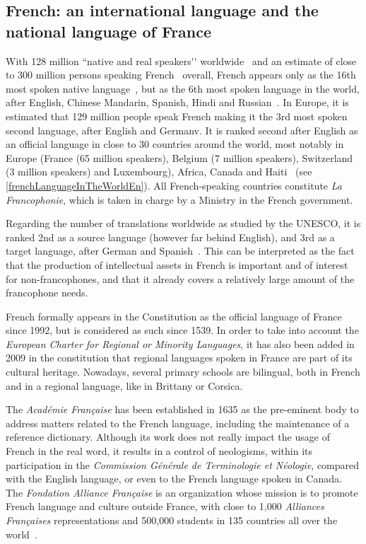 \begin{multicols}{2}

\subsection{French: an international language and the national language of France}
With 128 million ``native and real speakers{\mbox '}{\mbox '} worldwide~\cite{native} and an estimate
of close to 300 million persons speaking French~\cite{francais} overall, French
appears only as the 16th most spoken native language~\cite{Lewis2009}, but as the
6th most spoken language in the world, after English, Chinese
Mandarin, Spanish, Hindi and Russian~\cite{russe}. In Europe, it is estimated
that 129 million people speak French making it the 3rd most spoken
second language, after English and Germanv. It is ranked second after
English as an official language in close to 30 countries around the
world, most notably in Europe (France (65 million speakers), Belgium
(7 million speakers), Switzerland (3 million speakers) and
Luxembourg), Africa, Canada and Haiti~\cite{haiti} (see \ref{frenchLanguageInTheWorldEn}). All
French-speaking countries constitute {\em La Francophonie}, which is taken
in charge by a Ministry in the French government.

Regarding the number of translations worldwide as studied by the
UNESCO, it is ranked 2nd as a source language (however far behind
English), and 3rd as a target language, after German and
Spanish~\cite{espagnol}. This can be interpreted as the fact that the production of
intellectual assets in French is important and of interest for
non-francophones, and that it already covers a relatively large amount
of the francophone needs.

French formally appears in the Constitution as the official language
of France since 1992, but is considered as such since 1539. In order
to take into account the {\em European Charter for Regional or Minority
Languages}, it has also been added in 2009 in the constitution that
regional languages spoken in France are part of its cultural
heritage. Nowadays, several primary schools are bilingual, both in
French and in a regional language, like in Brittany or Corsica.

The {\em Académie Française} has been established in 1635 as the pre-eminent
body to address matters related to the French language, including the
maintenance of a reference dictionary. Although its work does not
really impact the usage of French in the real word, it results in a
control of neologisms, within its participation in the {\em Commission
Générale de Terminologie et Néologie}, compared with the English
language, or even to the French language spoken in Canada. The
{\em Fondation Alliance Française} is an organization whose mission is to
promote French language and culture outside France, with close to
1,000 {\em Alliances Françaises} representations and 500,000 students in 135
countries all over the world~\cite{monde}.


\end{multicols}
